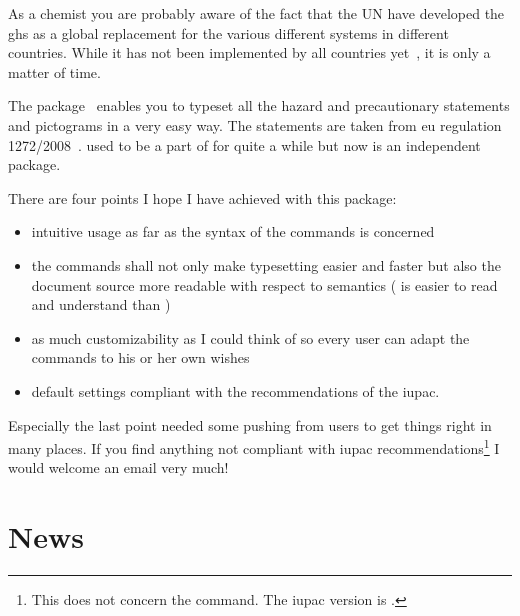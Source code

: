 \documentclass[load-preamble+]{cnltx-doc}
\begin{document}
As a chemist you are probably aware of the fact that the \acl{UN} have
developed the \ac{ghs} as a global replacement for the various different
systems in different countries.  While it has not been implemented by all
countries yet~\cite{unece:ghsystem_implementation}, it is only a matter of
time.

The package \ghsystem\ enables you to typeset all the hazard and precautionary
statements and pictograms in a very easy way.  The statements are taken from
\acs{eu} regulation 1272/2008~\cite{eu:ghsystem_regulation}.  \ghsystem{} used
to be a part of \chemmacros{} for quite a while but now is an independent
package.

There are four points I hope I have achieved with this package:
\begin{itemize}
  \item intuitive usage as far as the syntax of the commands is concerned
  \item the commands shall not only make typesetting easier and faster but also
    the document source more readable with respect to semantics
    ( is easier to read and understand than
    )
  \item as much customizability as I could think of so every user can adapt the
    commands to his or her own wishes
  \item default settings compliant with the recommendations of the \acf{iupac}.
\end{itemize}
Especially the last point needed some pushing from users to get things right
in many places.  If you find anything not compliant with \ac{iupac}
recommendations\footnote{This does not concern the  command. The
  \ac{iupac} version is \sarg.} I would welcome an email very much!

\section{News}
\end{document}
